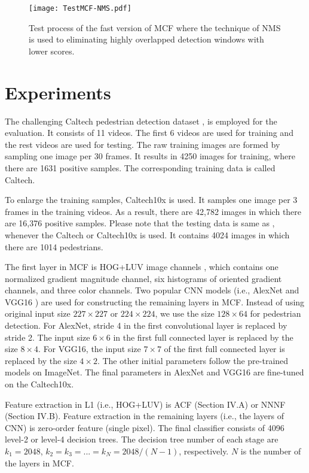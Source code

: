 \documentclass[journal]{IEEEtran}
\begin{document}
\begin{figure}[!t]
\label{MCF-NMS}
\centering
\texttt{[image: TestMCF-NMS.pdf]}
\caption{Test process of the fast version of MCF where the technique of NMS is used to eliminating highly overlapped detection windows with lower scores.
} 
\end{figure}

\section{Experiments}
The challenging Caltech pedestrian detection dataset \cite{Dollar_PD_CVPR_2009}, \cite{Dollar_PD_PAMI_2010} is employed for the evaluation. It consists of 11 videos. The first 6 videos are used for training and the rest videos are used for testing. The raw training images are formed by sampling one image per 30 frames. It results in 4250 images for training, where there are 1631 positive samples. The corresponding training data is called Caltech.

To enlarge the training samples, Caltech10x is used. It samples one image per 3 frames in the training videos. As a result, there are 42,782 images in which there are 16,376 positive samples. Please note that the testing data is same as \cite{Dollar_PD_CVPR_2009}, \cite{Dollar_PD_PAMI_2010} whenever the Caltech or Caltech10x is used. It contains 4024 images in which there are 1014 pedestrians.

The first layer in MCF is HOG+LUV image channels \cite{Dollar_ICF_BMVC_2009}, which contains one normalized gradient magnitude channel, six histograms of oriented gradient channels, and three color channels. Two popular CNN models (i.e., AlexNet \cite{Krizhevsky_AlexNet_NIPS_2012} and VGG16 \cite{Simonyan_VGG_arXiv_2015}) are used for constructing the remaining layers in MCF. Instead of using original input size $227\times227$ or $224\times224$, we use the size $128\times64$ for pedestrian detection. For AlexNet, stride 4 in the first convolutional layer is replaced by stride 2. The input size $6\times6$ in the first full connected layer is replaced by the size $8\times4$. For VGG16, the input size $7\times7$ of the first full connected layer is replaced by the size $4\times2$. The other initial parameters follow the pre-trained models on ImageNet. The final parameters in AlexNet and VGG16 are fine-tuned on the Caltech10x.

Feature extraction in L1 (i.e., HOG+LUV) is ACF \cite{Dollar_ACF_PAMI_2014} (Section IV.A) or NNNF \cite{Cao_NNNF_arXiv_2015} (Section IV.B). Feature extraction in the remaining layers (i.e., the layers of CNN) is zero-order feature (single pixel). The final classifier consists of 4096 level-2 or level-4 decision trees. The decision tree number of each stage are $k_1=2048$, $k_2=k_3=...=k_N=2048/(N-1)$, respectively. $N$ is the number of the layers in MCF.
\end{document}
